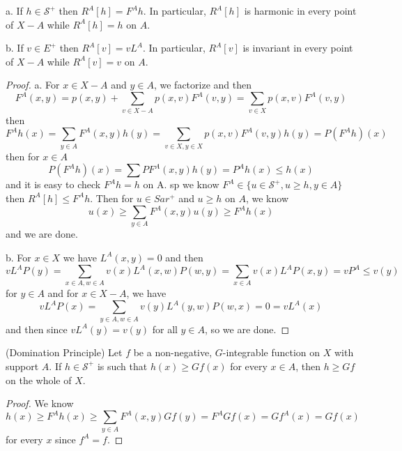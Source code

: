 \documentclass[lang=en,11pt,a4paper,citestyle =authoryear]{elegantpaper}
\newcommand{\Sar}{\mathcal{S}}
\begin{document}
\begin{theorem}
    a. If $h\in \Sar^+$ then $R^A[h] = F^Ah$. In particular, $R^A[h]$ is harmonic in every point of $X-A$ while $R^A[h] = h$ on $A$.\par
    b. If $v\in E^+$ then $R^A[v] = vL^A$. In particular, $R^A[v]$ is invariant in every point of $X-A$ while $R^A[v] = v$ on $A$.
\end{theorem}
\begin{proof}
    a. For $x\in X-A$ and $y\in A$, we factorize and then
    \[
    F^A(x,y) = p(x,y) + \sum\limits_{v\in X-A} p(x,v)F^A(v,y) = \sum_{v\in X} p(x,v)F^A(v,y)
    \]
    then
    \[
    F^Ah(x) = \sum\limits_{y\in A}F^A(x,y)h(y) = \sum\limits_{v\in X,y\in X} p(x,v)F^A(v,y)h(y) = P(F^A h)(x)
    \]
    then for $x\in A$
    \[
    P(F^Ah)(x) = \sum PF^A(x,y)h(y) = P^Ah(x) \leq h(x)
    \]
    and it is easy to check $F^Ah = h$ on A. sp we know $F^A \in \{u\in \Sar^+, u\geq h, y\in A\}$ then $R^A[h] \leq F^A h$. Then for $u \in Sar^+$ and $u\geq h$ on $A$, we know
    \[
    u(x) \geq \sum_{y\in A}F^A(x,y)u(y) \geq F^Ah(x)
    \]
    and we are done.\par
    b. For $x\in X$ we have $L^A(x,y) = 0$ and then
    \[
    vL^AP(y) = \sum\limits_{x\in A,w\in A}v(x)L^A(x,w)P(w,y) = \sum\limits_{x\in A}v(x)L^AP(x,y) = vP^A \leq v(y)
    \]
    for $y \in A$ and for $x\in X-A$, we have
    \[
    vL^AP(x) = \sum\limits_{y\in A,w\in A}v(y)L^A(y,w)P(w,x) = 0 = vL^A(x)
    \]
    and then since $vL^A(y) = v(y)$ for all $y\in A$, so we are done.\par
\end{proof}

\begin{theorem}
    (Domination Principle)
    Let $f$ be a non-negative, $G$-integrable function on $X$ with support $A$. If $h\in \Sar^+$ is such that $h(x) \geq Gf(x)$ for every $x\in A$, then $h\geq Gf$ on the whole of $X$.
\end{theorem}
\begin{proof}
    We know
    \[
    h(x) \geq F^Ah(x) \geq \sum\limits_{y\in A}F^A(x,y)Gf(y) = F^AGf(x) = Gf^A(x) = Gf(x) 
    \]
    for every $x$ since $f^A = f$.
\end{proof}
\end{document}
